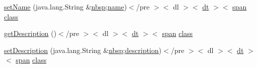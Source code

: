 \begin{DoxyCompactItemize}
\item 
\hyperlink{_sensor_8_sensor_type_8html_a67da6c6420602717ea42bcaad788568e}{set\-Name} (java.\-lang.\-String \&\hyperlink{_tools_8html_aef915316f784c9063d942974538301a6}{nbsp};\hyperlink{_cloudia_d_b_8html_ab74e6bf80237ddc4109968cedc58c151}{name})$<$/pre $>$$<$ dl $>$$<$ \hyperlink{stylesheet_8css_a107565fb4039d33b041380d6e0ea1d80}{dt} $>$$<$ \hyperlink{stylesheet_8css_a8343996ebcf16220b04e54659aac31cc}{span} \hyperlink{_tools_8html_acf06f836132665ba8114f5a414c2403f}{class}
\item 
\hyperlink{_sensor_8_sensor_type_8html_a8bdf2881601ef38163b9bbfd5883de06}{get\-Description} ()$<$/pre $>$$<$ dl $>$$<$ \hyperlink{stylesheet_8css_a107565fb4039d33b041380d6e0ea1d80}{dt} $>$$<$ \hyperlink{stylesheet_8css_a8343996ebcf16220b04e54659aac31cc}{span} \hyperlink{_tools_8html_acf06f836132665ba8114f5a414c2403f}{class}
\item 
\hyperlink{_sensor_8_sensor_type_8html_a2874a5cb430c36d7b957e039bb856410}{set\-Description} (java.\-lang.\-String \&\hyperlink{_tools_8html_aef915316f784c9063d942974538301a6}{nbsp};\hyperlink{_cloudia_d_b_8html_a2661f439a4a94ffdcd5e47ae1da0bb1d}{description})$<$/pre $>$$<$ dl $>$$<$ \hyperlink{stylesheet_8css_a107565fb4039d33b041380d6e0ea1d80}{dt} $>$$<$ \hyperlink{stylesheet_8css_a8343996ebcf16220b04e54659aac31cc}{span} \hyperlink{_tools_8html_acf06f836132665ba8114f5a414c2403f}{class}
\end{DoxyCompactItemize}
